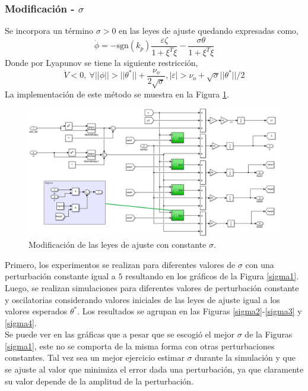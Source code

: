 \documentclass[letterpaper,11pt]{article} %
\begin{document}
\subsubsection{Modificación - $\sigma$}
Se incorpora un término $\sigma>0$ en las leyes de ajuste quedando expresadas como,
\begin{equation}
	\dot{\phi} =-\mathrm{sgn}(k_p) \frac{\varepsilon \zeta}{1 + \xi^T \xi} - \frac{\sigma \theta}{1 + \xi^T \xi}
\end{equation}
Donde por Lyapunov se tiene la siguiente restricción,
\begin{equation}
	\dot{V} < 0,\ \forall ||\phi||>||\theta^*|| + \frac{\nu_o}{2\sqrt{\sigma}}, |\varepsilon|>\nu_o + \sqrt{\sigma} ||\theta^*||/2
\end{equation}
La implementación de este método se muestra en la Figura \ref{sigmametodo}.
\begin{figure}
	\centering
	\includegraphics[width=14cm]{sigmametodo.png}
	\caption{Modificación de las leyes de ajuste con constante $\sigma$.}
	\label{sigmametodo}
\end{figure}
Primero, los experimentos se realizan para diferentes valores de $\sigma$ con una perturbación constante igual a $5$ resultando en los gráficos de la Figura \ref{sigma1}. Luego, se realizan simulaciones para diferentes valores de perturbación constante y oscilatorias considerando valores iniciales de las leyes de ajuste igual a los valores esperados $\theta^*$. Los resultados se agrupan en las Figuras \ref{sigma2}-\ref{sigma3} y \ref{sigma4}.\\

Se puede ver en las gráficas que a pesar que se escogió el mejor $\sigma$ de la Figuras \ref{sigma1}, este no se comporta de la misma forma con otras perturbaciones constantes. Tal vez sea un mejor ejercicio estimar $\sigma$ durante la simulación y que se ajuste al valor que minimiza el error dada una perturbación, ya que claramente su valor depende de la amplitud de la perturbación.
\end{document}
